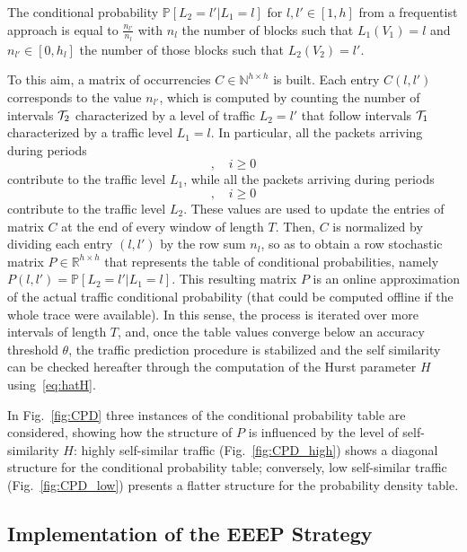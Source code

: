 \documentclass[journal,10pt,twoside,final]{IEEEtran}
\begin{document}
The conditional probability ${\mathbb P}[L_2 = l' | L_1 = l]$ for $l,l' \in [1,h]$ from a frequentist approach is equal to $\frac{n_{l'}}{n_l}$ with $n_l$ the number of blocks such that $L_1(V_1) = l$ and $n_{l'} \in [0, h_l]$ the number of those blocks such that $L_2(V_2) = l'$.

To this aim, a matrix of occurrencies $C\in\mathbb N^{h \times h}$ is built. Each entry $C(l,l')$ corresponds to the value $n_{l'}$, which is computed by counting the number of intervals ${\cal T}_2$ characterized by a level of traffic $L_2 = l'$ that follow intervals ${\cal T}_1$ characterized by a traffic level $L_1 = l$. In particular, all the packets arriving during periods
\begin{equation}
[iT,iT + T^\prime ],\quad i\geq 0
\end{equation}
contribute to the traffic level $L_1$, while all the packets arriving during periods
\begin{equation}
[iT + T^\prime ,(i+1)T],\quad i\geq 0
\end{equation}
contribute to the traffic level $L_2$. These values are used to update the entries of matrix $C$ at the end of every window of length $T$.
Then, $C$ is normalized by dividing each entry $(l,l')$ by the row sum $n_{l}$, so as to obtain a row stochastic matrix $P\in\mathbb R ^{h \times h}$ that represents the table of conditional probabilities, namely $P(l,l')={\mathbb P}[L_2 = l' | L_1 = l]$.
This resulting matrix $P$ is an online approximation of the actual traffic conditional probability (that could be computed offline if the whole trace were available).
In this sense, the process is iterated over more intervals of length $T$, and, once the table values converge below an accuracy threshold $\theta$, the traffic prediction procedure is stabilized and the self similarity can be checked hereafter through the computation of the Hurst parameter $H$ using~\eqref{eq:hatH}.


In Fig.~\ref{fig:CPD} three instances of the conditional probability table are considered, showing how the structure of $P$ is influenced by the level of self-similarity $H$: highly self-similar traffic (Fig.~\ref{fig:CPD_high}) shows a diagonal structure for the conditional probability table; conversely, low self-similar traffic (Fig.~\ref{fig:CPD_low}) presents a flatter structure for the probability density table.

\subsection{Implementation of the EEEP Strategy}
\label{subsec:EEEP-impl}
\end{document}
